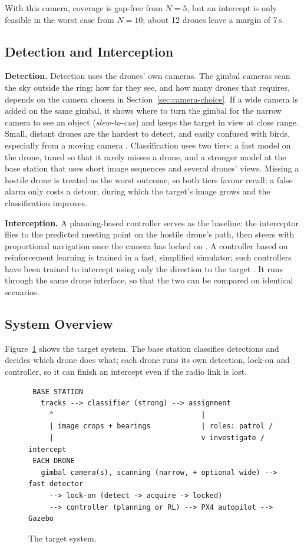 With this camera, coverage is gap-free from $N = 5$, but an intercept is only
feasible in the worst case from $N = 10$; about 12 drones leave a margin of
7\,s.

\subsection{Detection and Interception}
\label{sec:target-approach}

\textbf{Detection.} Detection uses the drones' own cameras. The gimbal
cameras scan the sky outside the ring; how far they see, and how many drones
that requires, depends on the camera chosen in
Section~\ref{sec:camera-choice}. If a wide camera is added on the same
gimbal, it shows where to turn the gimbal for the narrow camera to see an
object (\emph{slew-to-cue}) and keeps the target in
view at close range. Small, distant drones are the hardest to detect, and
easily confused with birds, especially from a moving camera
\cite{coluccia2021drone}. Classification uses two tiers: a fast model on the
drone, tuned so that it rarely misses a drone, and a stronger model at the
base station that uses short image sequences and several drones' views.
Missing a hostile drone is treated as the worst outcome, so both tiers favour
recall; a false alarm only costs a detour, during which the target's image
grows and the classification improves.

\textbf{Interception.} A planning-based controller serves as the baseline: the
interceptor flies to the predicted meeting point on the hostile drone's path,
then steers with proportional navigation once the camera has locked on
\cite{zarchan2019tactical}. A controller based on reinforcement learning is
trained in a fast, simplified simulator; such controllers have been trained
to intercept using only the direction to the target
\cite{gaudet2019reinforcement}. It runs through the same drone interface, so
that the two can be compared on identical scenarios.

\subsection{System Overview}

Figure~\ref{fig:final-system} shows the target system. The base station
classifies detections and decides which drone does what; each drone runs its
own detection, lock-on and controller, so it can finish an intercept even if
the radio link is lost.

\begin{figure}[H]
\centering
\small
\begin{verbatim}
 BASE STATION
   tracks --> classifier (strong) --> assignment
     ^                                   |
     | image crops + bearings            | roles: patrol /
     |                                   v investigate / intercept
 EACH DRONE
   gimbal camera(s), scanning (narrow, + optional wide) --> fast detector
     --> lock-on (detect -> acquire -> locked)
     --> controller (planning or RL) --> PX4 autopilot --> Gazebo
\end{verbatim}
\caption{The target system.}
\label{fig:final-system}
\end{figure}
